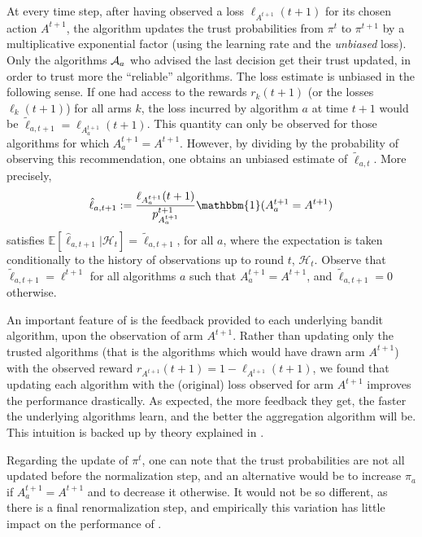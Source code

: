 At every time step, after having observed a loss $\ell_{A^{t+1}}(t+1)$ for its chosen action $A^{t+1}$,
the algorithm updates the trust probabilities from $\pi^t$ to $\pi^{t+1}$ by
a multiplicative exponential factor (using the learning rate and the \emph{unbiased} loss).
%
Only the algorithms $\mathcal{A}_a$ who advised the last decision get their trust updated, in order to trust more the ``reliable'' algorithms.
The loss estimate is unbiased in the following sense. If one had access to the rewards $r_k(t+1)$ (or the losses $\ell_k(t+1)$) for all arms $k$, the loss incurred by algorithm $a$ at time $t+1$ would be $\tilde{\ell}_{a,t+1} = \ell_{A_a^{t+1}}(t+1)$. This quantity can only be observed for those algorithms for which $A_{a}^{t+1}=A^{t+1}$. However, by dividing by the probability of observing this recommendation, one obtains an unbiased estimate of $\tilde{\ell}_{a,t}$. More precisely,
\[\hat{\ell}_{a,t+1} := \frac{\ell_{A_a^{t+1}}(t+1)}{p_{A_a^{t+1}}^{t+1}} \mathbbm{1}(A_a^{t+1} = A^{t+1})\] satisfies $\mathbb{E}[\hat{\ell}_{a,t+1} | \mathcal{H}_t] = \tilde{\ell}_{a,t+1}$, for all $a$, where the expectation is taken conditionally to the history of observations up to round $t$, $\mathcal{H}_{t}$. Observe that $\tilde{\ell}_{a,t+1}=\ell^{t+1}$ for all algorithms $a$ such that $A_a^{t+1}=A^{t+1}$, and $\tilde{\ell}_{a,t+1}=0$ otherwise.


An important feature of \Aggr{} is the feedback provided to each underlying bandit algorithm, upon the observation of arm $A^{t+1}$. Rather than updating only the trusted algorithms (that is the algorithms which would have drawn arm $A^{t+1}$) with the observed reward $r_{A^{t+1}}(t+1)=1 - \ell_{A^{t+1}}(t+1)$,  we found that updating each algorithm with the (original) loss observed for arm $A^{t+1}$ improves the performance drastically.
%
As expected, the more feedback they get, the faster the underlying algorithms learn, and the better the aggregation algorithm will be. This intuition is backed up by theory explained in \cite{Maillard11}.


Regarding the update of $\pi^t$, one can note that the trust probabilities are not all updated before the normalization step,
and an alternative would be to
increase $\pi_{a}$ if $A^{t+1}_a = A^{t+1}$ and to decrease it otherwise.
It would not be so different, as there is a final renormalization step, and empirically this variation has little impact on the performance of \Aggr{}.



